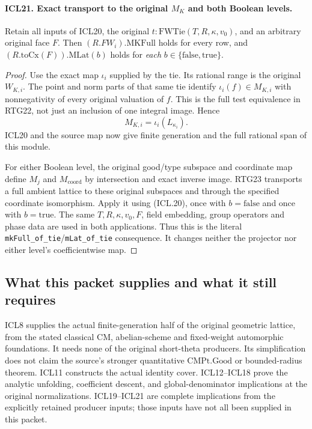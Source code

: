 \documentclass[11pt,a4paper]{article}
\numberwithin{equation}{section}
\theoremstyle{remark}\newtheorem{remark}[theorem]{Remark}
\begin{document}
\paragraph{ICL21. Exact transport to the original \(M_K\) and both Boolean levels.}
\label{claim:ICL21}
Retain all inputs of ICL20, the original
\(t:\mathrm{FWTie}(T,R,\kappa,v_0)\), and an
arbitrary original face \(F\).  Then
\((R.FW_i).\mathrm{MKFull}\) holds for every row,
and \((R.\mathrm{toCx}(F)).\mathrm{MLat}(b)\)
holds for \emph{each} \(b\in\{\mathrm{false},
\mathrm{true}\}\).
\begin{proof}
Use the exact map \(\iota_i\) supplied by the tie.
Its rational range is the original \(W_{K,i}\).
The point and norm parts of that same tie identify
\(\iota_i(f)\in M_{K,i}\) with nonnegativity of
every original valuation of \(f\).  This is the
full test equivalence in RTG22, not just an
inclusion of one integral image.  Hence
\[
 M_{K,i}=\iota_i(L_{\kappa_i}).                         \tag{ICL.20}
\]
ICL20 and the source map now give finite generation
and the full rational span of this module.

For either Boolean level, the original good/type
subspace and coordinate map define \(M_j\) and
\(M_{\mathrm{coord}}\) by intersection and exact
inverse image.  RTG23 transports a full ambient
lattice to these original subspaces and through
the specified coordinate isomorphism.  Apply it
using (ICL.20), once with \(b=\mathrm{false}\)
and once with \(b=\mathrm{true}\).  The same
\(T,R,\kappa,v_0,F\), field embedding, group
operators and phase data are used in both
applications.  Thus this is the literal
\texttt{mk\allowbreak Full\_\allowbreak of\_\allowbreak tie}/\texttt{m\allowbreak Lat\_\allowbreak of\_\allowbreak tie}
consequence.  It changes neither the projector
nor either level's coefficientwise map.
\end{proof}

\subsection{What this packet supplies and what it still requires}

ICL8 supplies the actual finite-generation half of
the original geometric lattice, from the stated
classical CM, abelian-scheme and fixed-weight
automorphic foundations.  It needs none of the
original short-theta producers.  Its simplification
does not claim the source's stronger quantitative
\(\mathrm{CMPt.Good}\) or bounded-radius theorem.
ICL11 constructs the actual identity cover.  ICL12--ICL18
prove the analytic unfolding, coefficient descent,
and global-denominator implications at the original
normalizations.  ICL19--ICL21 are complete implications
from the explicitly retained producer inputs; those
inputs have not all been supplied in this packet.
\end{document}
